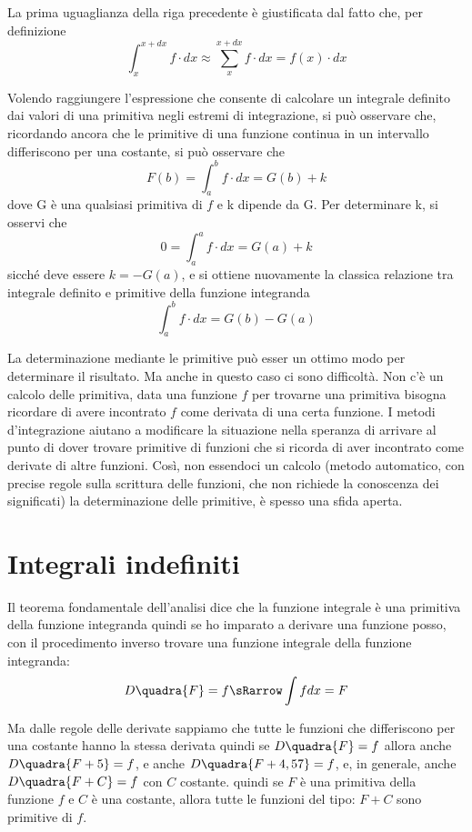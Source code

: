 La prima uguaglianza della riga
precedente è giustificata dal fatto che, per definizione 
\[\int_x^{x+dx} f \cdot dx \approx \sum_x^{x+dx} f \cdot dx = f(x) \cdot dx\]

Volendo raggiungere l'espressione che consente di calcolare un integrale 
definito dai valori di una primitiva negli estremi di integrazione, si può 
osservare che, ricordando ancora che le primitive di una funzione continua in 
un intervallo differiscono per una costante, si può osservare che
\[F(b) = \int_a^b f \cdot dx = G(b) + k\]
dove G è una qualsiasi primitiva di \(f\) e k dipende da G. Per determinare k, 
si osservi che
\[0 = \int_a^a f \cdot dx = G(a) + k\]
sicché deve essere \(k = - G(a)\), e si ottiene nuovamente la classica 
relazione tra integrale definito e primitive della funzione integranda 
\[\int_a^b f \cdot dx = G(b) - G(a)\]

La determinazione mediante le primitive può esser un ottimo modo per 
determinare il risultato. Ma anche in questo caso ci sono difficoltà. Non c'è 
un calcolo delle primitiva, data una funzione \(f\) per trovarne una 
primitiva bisogna ricordare di avere incontrato \(f\) come derivata di una 
certa funzione. 
I metodi d'integrazione aiutano a modificare la situazione nella speranza di 
arrivare al punto di dover trovare primitive di funzioni che si ricorda di 
aver incontrato come derivate di altre funzioni. Così, non 
essendoci un calcolo (metodo automatico, con precise regole sulla scrittura 
delle funzioni, che non richiede la conoscenza dei significati) la 
determinazione delle primitive, è spesso una sfida aperta.

\section{Integrali indefiniti}
\label{sec:integrali_indefiniti}

Il teorema fondamentale dell'analisi dice che la funzione integrale è una 
primitiva della funzione integranda quindi se ho imparato a derivare una 
funzione posso, con il procedimento inverso trovare una funzione integrale 
della funzione integranda:
\[D \quadra{F} = f \sRarrow \int f dx = F\]

Ma dalle regole delle derivate sappiamo che tutte le funzioni che 
differiscono per una costante hanno la stessa derivata quindi se 
\(D \quadra{F} = f\) allora anche \(D \quadra{F+5} = f\), e anche 
\(D \quadra{F+4,57} = f\), e, in generale, anche \(D \quadra{F+C} = f\) con 
\(C\) costante.
quindi se \(F\) è una primitiva della funzione \(f\) e \(C\) è una 
costante, allora tutte le funzioni del tipo: \(F + C\) sono primitive di 
\(f\).

